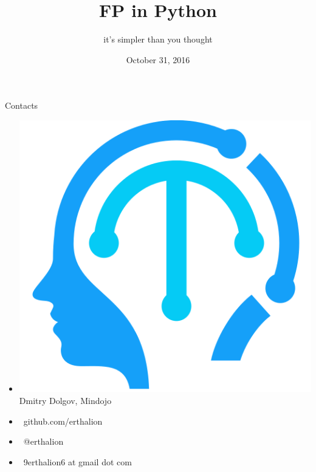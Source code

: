 \documentclass[18pt, compress, aspectratio=169]{beamer}
\title{FP in Python}
\subtitle{it's simpler than you thought}
\date{October 31, 2016}
\institute{}
\def\twitter{{\FA \faTwitter}}
\def\github{{\FA \faGithubSign}}
\def\email{{\FA \faEnvelope}}
\begin{document}
\fontsize{17pt}{18}\selectfont
\maketitle

\section{}

\begin{frame}{Contacts}
    \begin{itemize}[label={}]
        \item \includegraphics[scale=0.04]{mindojo_logo.png} Dmitry Dolgov, Mindojo
        \item {\github\ github.com/erthalion}
        \item {\twitter\ @erthalion}
        \item \email\ 9erthalion6 at gmail dot com
    \end{itemize}
\end{frame}
\end{document}
